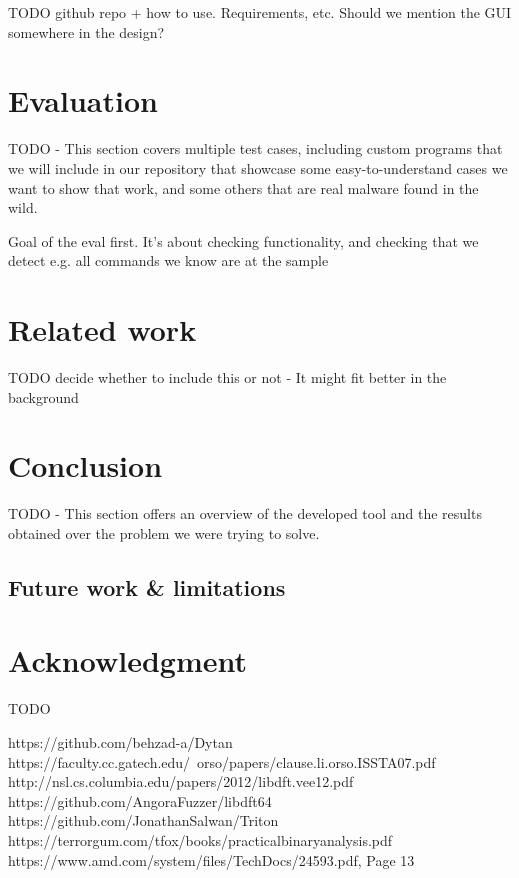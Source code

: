 \documentclass[conference]{IEEEtran}
\begin{document}
TODO github repo + how to use. Requirements, etc.
Should we mention the GUI somewhere in the design?


\section{Evaluation}
TODO - This section covers multiple test cases, including custom programs that
we will include in our repository that showcase some easy-to-understand cases
we want to show that work, and some others that are real malware found in the
wild.

Goal of the eval first. It's about checking functionality, and checking that we
detect e.g. all commands we know are at the sample

\section{Related work}
TODO decide whether to include this or not - It might fit better in the
background

\section{Conclusion}
TODO - This section offers an overview of the developed tool and the results
obtained over the problem we were trying to solve.

\subsection{Future work \& limitations}

\section*{Acknowledgment}
TODO



\begin{thebibliography}{00}
     https://github.com/behzad-a/Dytan
     https://faculty.cc.gatech.edu/~orso/papers/clause.li.orso.ISSTA07.pdf
     http://nsl.cs.columbia.edu/papers/2012/libdft.vee12.pdf
     https://github.com/AngoraFuzzer/libdft64
     https://github.com/JonathanSalwan/Triton
     https://terrorgum.com/tfox/books/practicalbinaryanalysis.pdf
     https://www.amd.com/system/files/TechDocs/24593.pdf, Page 13

\end{thebibliography}
\vspace{12pt}
\end{document}

